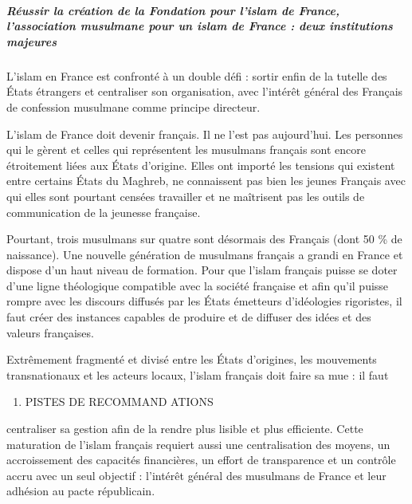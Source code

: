 \hypertarget{ruxe9ussir-la-cruxe9ation-de-la-fondation-pour-lislam-de-france-lassociation-musulmane-pour-un-islam-de-france-deux-institutions-majeures}{%
\subparagraph{Réussir la création de la Fondation pour l'islam de
France, l'association musulmane pour un islam de France : deux
institutions
majeures}\label{ruxe9ussir-la-cruxe9ation-de-la-fondation-pour-lislam-de-france-lassociation-musulmane-pour-un-islam-de-france-deux-institutions-majeures}}


L'islam en France est confronté à un double défi : sortir enfin de la
tutelle des États étrangers et centraliser son organisation, avec
l'intérêt général des Français de confession musulmane comme principe
directeur.

L'islam de France doit devenir français. Il ne l'est pas aujourd'hui.
Les personnes qui le gèrent et celles qui représentent les musulmans
français sont encore étroitement liées aux États d'origine. Elles ont
importé les tensions qui existent entre certains États du Maghreb, ne
connaissent pas bien les jeunes Français avec qui elles sont pourtant
censées travailler et ne maîtrisent pas les outils de communication de
la jeunesse française.

Pourtant, trois musulmans sur quatre sont désormais des Français (dont
50 \% de naissance). Une nouvelle génération de musulmans français a
grandi en France et dispose d'un haut niveau de formation. Pour que
l'islam français puisse se doter d'une ligne théologique compatible avec
la société française et afin qu'il puisse rompre avec les discours
diffusés par les États émetteurs d'idéologies rigoristes, il faut créer
des instances capables de produire et de diffuser des idées et des
valeurs françaises.

Extrêmement fragmenté et divisé entre les États d'origines, les
mouvements transnationaux et les acteurs locaux, l'islam français doit
faire sa mue : il faut


\begin{enumerate}
\def\labelenumi{\Roman{enumi}.}
\setcounter{enumi}{3}
\item
  
  PISTES DE RECOMMAND ATIONS
  
\end{enumerate}


centraliser sa gestion afin de la rendre plus lisible et plus
efficiente. Cette maturation de l'islam français requiert aussi une
centralisation des moyens, un accroissement des capacités financières,
un effort de transparence et un contrôle accru avec un seul objectif :
l'intérêt général des musulmans de France et leur adhésion au pacte
républicain.


